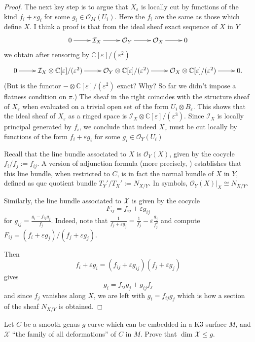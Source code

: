 {\begin{proof}
The next key step is to argue that
$X_\varepsilon$ is locally cut by
functions of the kind $f_i + \varepsilon g_i$
for some $g_i \in \mathcal{O}_M(U_i)$.
Here the $f_i$ are the same as those which
define $X$.
I think a proof is that from the ideal sheaf
exact sequence of $X$ in $Y$
$$
\xymatrix{
0\ar[r]
&\mathcal{I}_X\ar[r]
&\mathcal{O}_Y\ar[r]
&\mathcal{O}_X\ar[r]
&0
}
$$
we obtain after tensoring by
$\mathbb{C}[\varepsilon]/(\varepsilon^2)$
$$
\xymatrix{
0\ar[r]
&\mathcal{I}_X \otimes
\mathbb{C}[\varepsilon]/(\varepsilon^2)\ar[r]
&\mathcal{O}_Y \otimes
\mathbb{C}[\varepsilon]/(\varepsilon^2)\ar[r]
&\mathcal{O}_X \otimes
\mathbb{C}[\varepsilon]/(\varepsilon^2)\ar[r]
&0.
}
$$
(But is the functor $-\otimes
\mathbb{C}[\varepsilon]/(\varepsilon^2)$
exact? Why? So far we didn't impose a
flatness condition on $\pi$.)
The sheaf in the right
coincides with the structure sheaf of
$X_\varepsilon$ when
evaluated on a trivial open set of the form
$U_i \otimes B_\varepsilon$.
This shows that the ideal sheaf of
$X_\varepsilon$
as a ringed space is
$\mathcal{I}_X
\otimes\mathbb{C}[\varepsilon]/
(\varepsilon^3)$.
Since $\mathcal{I}_X$ is locally principal
generated by $f_i$,
we conclude that indeed $X_\varepsilon$
must be cut locally by functions of the form
$f_i + \varepsilon g_i$
for some $g_i \in \mathcal{O}_Y(U_i)$

Recall that the line bundle associated to $X$
is $\mathcal{O}_Y(X)$, given by the cocycle
$f_i/f_j:=f_{ij}$.
A version of adjunction formula
(more precisely, \cite[Adjunction formula I,
p. 146]{GH})
establishes that this line bundle,
when restricted to $C$, is in fact
the normal bundle of $X$ in $Y$, defined as
que quotient
bundle $T_Y'/T_X':=N_{X/Y}$.
In symbols, $\mathcal{O}_Y(X)|_{X}\cong
N_{X/Y}$.

Similarly, the line bundle associated to
$\mathcal{X}$
is given by the cocycle
$$
F_{ij}=f_{ij}+\varepsilon g_{ij}
$$
for $g_{ij}=\frac{g_i-f_{ij}g_j}{f_j}$.
Indeed, note that
$\frac{1}{f_j+\varepsilon
g_j}=\frac{1}{f_j}-\varepsilon
\frac{g_j}{f^2_j}$
and compute $F_{ij}=(f_i+\varepsilon
g_j)/(f_j+\varepsilon g_j)$.

Then
$$
f_i+\varepsilon g_i=(f_{ij}+\varepsilon
g_{ij})(f_j+\varepsilon g_j)
$$
gives
$$
g_i=f_{ij}g_j+g_{ij}f_j
$$
and since $f_j$ vanishes along $X$,
we are left with $g_i=f_{ij}g_j$
which is how a section of the sheaf $N_{X/Y}$
is obtained.
\end{proof}

\begin{exercise}
\label{exercise-deformations-curve-in-k3}
Let $C$ be a smooth genus $g$ curve which
can be embedded in a K3 surface $M$, and
$\mathcal{X}$
``the family of all deformations'' of $C$ in
$M$.
Prove that $\dim \mathcal{X} \leq g$.
\end{exercise}

}
